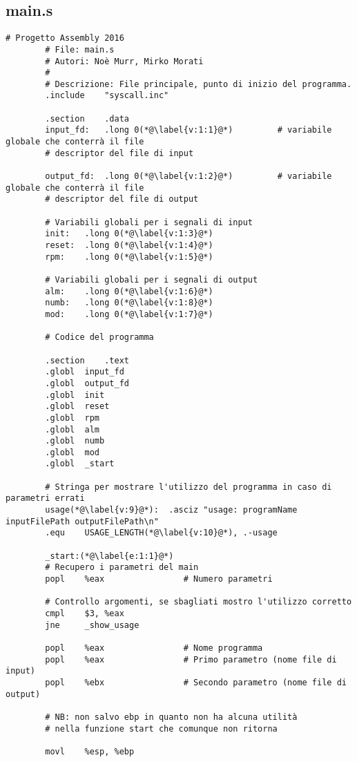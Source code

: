 \documentclass[a4paper,11pt]{article}
\begin{document}
		\subsection{main.s}
		\begin{lstlisting}[language=MyAssembler, style=MyAsm]
		# Progetto Assembly 2016
		# File: main.s
		# Autori: Noè Murr, Mirko Morati
		#
		# Descrizione: File principale, punto di inizio del programma.
		.include    "syscall.inc"
		
		.section    .data
		input_fd:   .long 0(*@\label{v:1:1}@*)         # variabile globale che conterrà il file
		# descriptor del file di input
		
		output_fd:  .long 0(*@\label{v:1:2}@*)         # variabile globale che conterrà il file
		# descriptor del file di output
		
		# Variabili globali per i segnali di input
		init:   .long 0(*@\label{v:1:3}@*)
		reset:  .long 0(*@\label{v:1:4}@*)
		rpm:    .long 0(*@\label{v:1:5}@*)
		
		# Variabili globali per i segnali di output
		alm:    .long 0(*@\label{v:1:6}@*)
		numb:   .long 0(*@\label{v:1:8}@*)
		mod:    .long 0(*@\label{v:1:7}@*)
		
		# Codice del programma
		
		.section    .text
		.globl  input_fd
		.globl  output_fd
		.globl  init
		.globl  reset
		.globl  rpm
		.globl  alm
		.globl  numb
		.globl  mod
		.globl  _start
		
		# Stringa per mostrare l'utilizzo del programma in caso di parametri errati
		usage(*@\label{v:9}@*):  .asciz "usage: programName inputFilePath outputFilePath\n"
		.equ    USAGE_LENGTH(*@\label{v:10}@*), .-usage
		
		_start:(*@\label{e:1:1}@*)
		# Recupero i parametri del main
		popl    %eax                # Numero parametri
		
		# Controllo argomenti, se sbagliati mostro l'utilizzo corretto
		cmpl    $3, %eax
		jne     _show_usage
		
		popl    %eax                # Nome programma
		popl    %eax                # Primo parametro (nome file di input)
		popl    %ebx                # Secondo parametro (nome file di output)
		
		# NB: non salvo ebp in quanto non ha alcuna utilità
		# nella funzione start che comunque non ritorna
		
		movl    %esp, %ebp
		

\end{lstlisting}
\end{document}
